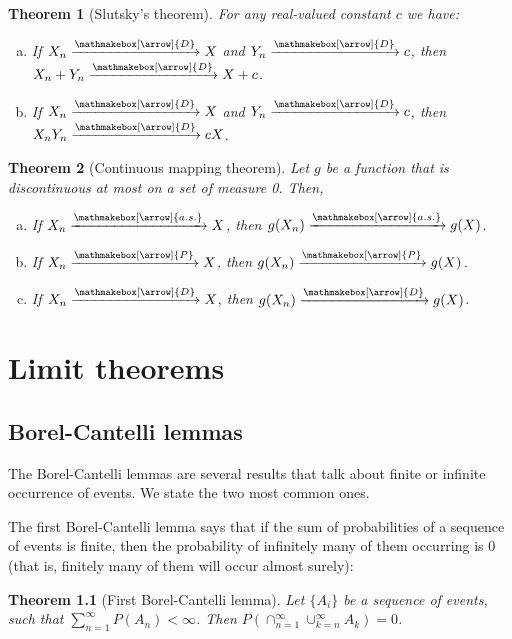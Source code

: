 \documentclass{book}
\theoremstyle{plain}%
\newtheorem{theorem}{Theorem}[section]
\theoremstyle{definition}
\newlength{\arrow}
\newcommand*{\myrightarrow}[1]{\xrightarrow{\mathmakebox[\arrow]{#1}}}
\begin{document}
\begin{theorem}[Slutsky's theorem] For any real-valued constant $c$ we have:

\begin{enumerate}[(a)]
\item If $X_n \myrightarrow{D} X$ and $Y_n \myrightarrow{D} c$, then $X_n + Y_n \myrightarrow{D} X + c$.
\item If $X_n \myrightarrow{D} X$ and $Y_n \myrightarrow{D} c$, then $X_nY_n \myrightarrow{D} cX$.
\end{enumerate}
\end{theorem}

\begin{theorem}[Continuous mapping theorem]
Let $g$ be a function that is discontinuous at most on a set of measure 0. Then,

\begin{enumerate}[(a)]
\item If $X_n \myrightarrow{a.s.} X$, then $g(X_n) \myrightarrow{a.s.} g(X)$.
\item If $X_n \myrightarrow{P} X$, then $g(X_n) \myrightarrow{P} g(X)$.
\item If $X_n \myrightarrow{D} X$, then $g(X_n) \myrightarrow{D} g(X)$.
\end{enumerate}
\end{theorem}

\chapter{Limit theorems}\label{sec:limit}

\section{Borel-Cantelli lemmas}\label{ch:bclemma}

The Borel-Cantelli lemmas are several results that talk about finite or infinite occurrence of events. We state the two most common ones.

The first Borel-Cantelli lemma says that if the sum of probabilities of a sequence of events is finite, then the probability of infinitely many of them occurring is 0 (that is, finitely many of them will occur almost surely):

\begin{theorem}[First Borel-Cantelli lemma] Let $\{A_i\}$ be a sequence of events, such that $\sum_{n=1}^\infty P(A_n) < \infty$. Then $P(\cap_{n=1}^\infty \cup_{k = n}^\infty A_k) = 0$.
\end{theorem}
\end{document}
